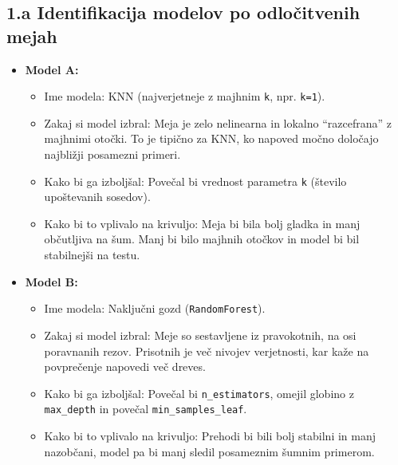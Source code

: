 \documentclass[12pt,a4paper]{article}
\begin{document}
\subsection*{1.a Identifikacija modelov po odločitvenih mejah}
\begin{itemize}
    \item \textbf{Model A:}
    \begin{itemize}
        \item Ime modela: KNN (najverjetneje z majhnim \texttt{k}, npr. \texttt{k=1}).
        \item Zakaj si model izbral: Meja je zelo nelinearna in lokalno ``razcefrana'' z majhnimi otočki. To je tipično za KNN, ko napoved močno določajo najbližji posamezni primeri.
        \item Kako bi ga izboljšal: Povečal bi vrednost parametra \texttt{k} (število upoštevanih sosedov).
        \item Kako bi to vplivalo na krivuljo: Meja bi bila bolj gladka in manj občutljiva na šum. Manj bi bilo majhnih otočkov in model bi bil stabilnejši na testu.
    \end{itemize}

    \item \textbf{Model B:}
    \begin{itemize}
        \item Ime modela: Naključni gozd (\texttt{RandomForest}).
        \item Zakaj si model izbral: Meje so sestavljene iz pravokotnih, na osi poravnanih rezov. Prisotnih je več nivojev verjetnosti, kar kaže na povprečenje napovedi več dreves.
        \item Kako bi ga izboljšal: Povečal bi \texttt{n\_estimators}, omejil globino z \texttt{max\_depth} in povečal \texttt{min\_samples\_leaf}.
        \item Kako bi to vplivalo na krivuljo: Prehodi bi bili bolj stabilni in manj nazobčani, model pa bi manj sledil posameznim šumnim primerom.
    \end{itemize}


\end{itemize}
\end{document}
